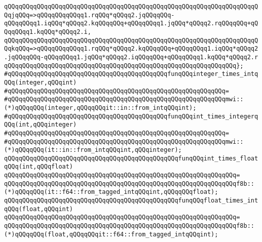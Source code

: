 \verb|qQQqqQQqqQQqqQQqqQQqqQQqqQQqqQQqqQQqqQQqqQQqqQQqqQQqqQQqqQQqqQQqqQQqqQQqjqQQq=>qQQqqQQqqQQqq1.rqQQq*qQQqq2.jqQQqqQQq-qQQqqQQqq1.iqQQq*qQQqq2.kqQQqqQQq+qQQqqQQqq1.jqQQq*qQQqq2.rqQQqqQQq+qQQqqQQqq1.kqQQq*qQQqq2.i,|\newline
\verb|qQQqqQQqqQQqqQQqqQQqqQQqqQQqqQQqqQQqqQQqqQQqqQQqqQQqqQQqqQQqqQQqqQQqqQQqkqQQq=>qQQqqQQqqQQqq1.rqQQq*qQQqq2.kqQQqqQQq+qQQqqQQqq1.iqQQq*qQQqq2.jqQQqqQQq-qQQqqQQqq1.jqQQq*qQQqq2.iqQQqqQQq+qQQqqQQqq1.kqQQq*qQQqq2.r|\newline
\verb|qQQqqQQqqQQqqQQqqQQqqQQqqQQqqQQqqQQqqQQqqQQqqQQqqQQqqQQqqQQqqQQq};|\newline
\newline
\verb|#qQQqqQQqqQQqqQQqqQQqqQQqqQQqqQQqqQQqqQQqqQQqfunqQQqinteger_times_intqQQq(integer,qQQqint)|\newline
\verb|#qQQqqQQqqQQqqQQqqQQqqQQqqQQqqQQqqQQqqQQqqQQqqQQqqQQqqQQqqQQq=|\newline
\verb|#qQQqqQQqqQQqqQQqqQQqqQQqqQQqqQQqqQQqqQQqqQQqqQQqqQQqqQQqqQQqmwi::(*)qQQqqQQq(integer,qQQqqQQqit::in::from_intqQQqint);|\newline
\newline
\verb|#qQQqqQQqqQQqqQQqqQQqqQQqqQQqqQQqqQQqqQQqqQQqfunqQQqint_times_integerqQQq(int,qQQqinteger)|\newline
\verb|#qQQqqQQqqQQqqQQqqQQqqQQqqQQqqQQqqQQqqQQqqQQqqQQqqQQqqQQqqQQq=|\newline
\verb|#qQQqqQQqqQQqqQQqqQQqqQQqqQQqqQQqqQQqqQQqqQQqqQQqqQQqqQQqqQQqmwi::(*)qQQqqQQq(it::in::from_intqQQqint,qQQqinteger);|\newline
\newline
\verb|qQQqqQQqqQQqqQQqqQQqqQQqqQQqqQQqqQQqqQQqqQQqqQQqfunqQQqint_times_floatqQQq(int,qQQqfloat)|\newline
\verb|qQQqqQQqqQQqqQQqqQQqqQQqqQQqqQQqqQQqqQQqqQQqqQQqqQQqqQQqqQQqqQQq=|\newline
\verb|qQQqqQQqqQQqqQQqqQQqqQQqqQQqqQQqqQQqqQQqqQQqqQQqqQQqqQQqqQQqqQQqf8b::(*)qQQqqQQq(it::f64::from_tagged_intqQQqint,qQQqqQQqfloat);|\newline
\newline
\verb|qQQqqQQqqQQqqQQqqQQqqQQqqQQqqQQqqQQqqQQqqQQqqQQqfunqQQqfloat_times_intqQQq(float,qQQqint)|\newline
\verb|qQQqqQQqqQQqqQQqqQQqqQQqqQQqqQQqqQQqqQQqqQQqqQQqqQQqqQQqqQQqqQQq=|\newline
\verb|qQQqqQQqqQQqqQQqqQQqqQQqqQQqqQQqqQQqqQQqqQQqqQQqqQQqqQQqqQQqqQQqf8b::(*)qQQqqQQq(float,qQQqqQQqit::f64::from_tagged_intqQQqint);|\newline
